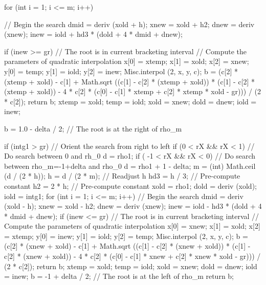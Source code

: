 \begin{code}
\begin{hide}
{{         for (int i = 1; i <= m; i++) { // Begin the search
            dmid = deriv (xold + h);
            xnew = xold + h2;
            dnew = deriv (xnew);
            inew = iold + hd3 * (dold + 4 * dmid + dnew);

            if (inew >= gr) { // The root is in current bracketing interval
               // Compute the parameters of quadratic interpolation
               x[0] = xtemp;
               x[1] = xold;
               x[2] = xnew;
               y[0] = temp;
               y[1] = iold;
               y[2] = inew;
               Misc.interpol (2, x, y, c);
               b = (c[2] * (xtemp + xold) - c[1] + Math.sqrt ((c[1]
                     - c[2] * (xtemp + xold)) * (c[1] - c[2]
                     * (xtemp + xold)) - 4 * c[2] * (c[0] - c[1]
                     * xtemp + c[2] * xtemp * xold - gr))) / (2 * c[2]);
               return b;
            }
            xtemp = xold;
            temp = iold;
            xold = xnew;
            dold = dnew;
            iold = inew;
         }
         b = 1.0 - delta / 2;    // The root is at the right of rho_m
      }

      if (intg1 > gr) {           // Orient the search from right to left
         if (0 < rX && rX < 1)   // Do search between 0 and rh_0
            d = rho1;
         if ( -1 < rX && rX < 0) // Do search between rho_m=-1+delta and rho_0
            d = rho1 + 1 - delta;
         m = (int) Math.ceil (d / (2 * h));
         h = d / (2 * m); // Readjust h
         hd3 = h / 3;     // Pre-compute constant
         h2 = 2 * h;      // Pre-compute constant
         xold = rho1;
         dold = deriv (xold);
         iold = intg1;
         for (int i = 1; i <= m; i++) { // Begin the search
            dmid = deriv (xold - h);
            xnew = xold - h2;
            dnew = deriv (xnew);
            inew = iold - hd3 * (dold + 4 * dmid + dnew);
            if (inew <= gr) { // The root is in current bracketing interval
               // Compute the parameters of quadratic interpolation
               x[0] = xnew;
               x[1] = xold;
               x[2] = xtemp;
               y[0] = inew;
               y[1] = iold;
               y[2] = temp;
               Misc.interpol (2, x, y, c);
               b = (c[2] * (xnew + xold) - c[1] + Math.sqrt ((c[1]
                   - c[2] * (xnew + xold)) * (c[1] - c[2]
                   * (xnew + xold)) - 4 * c[2] * (c[0] - c[1]
                   * xnew + c[2] * xnew * xold - gr))) / (2 * c[2]);
               return b;
            }
            xtemp = xold;
            temp = iold;
            xold = xnew;
            dold = dnew;
            iold = inew;
         }
         b = -1 + delta / 2; // The root is at the left of rho_m
      }
      return b;
   }\end{hide}
\end{code}
